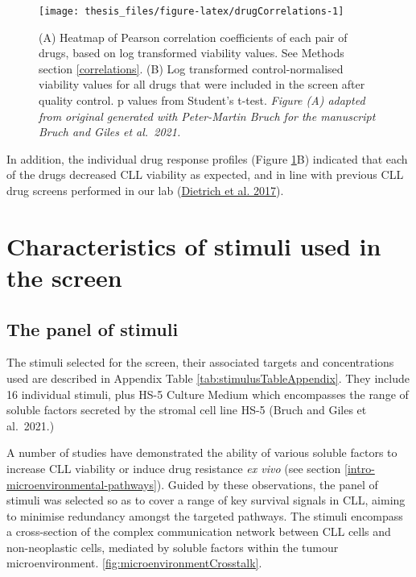 \documentclass[11pt, a4paper, twosided]{book}
\begin{document}
\begin{figure}

{\centering \texttt{[image: thesis\_files/figure-latex/drugCorrelations-1]} 

}

\caption{(A) Heatmap of Pearson correlation coefficients of each pair of drugs, based on log transformed viability values. See Methods section \ref{correlations}. (B) Log transformed control-normalised viability values for all drugs that were included in the screen after quality control. p values from Student's t-test. \emph{Figure (A) adapted from original generated with Peter-Martin Bruch for the manuscript Bruch and Giles et al.~2021.}}\label{fig:drugCorrelations}
\end{figure}
In addition, the individual drug response profiles (Figure \ref{fig:drugCorrelations}B) indicated that each of the drugs decreased CLL viability as expected, and in line with previous CLL drug screens performed in our lab (\protect\hyperlink{ref-JCIpaper}{Dietrich et al. 2017}).

\hypertarget{stimuli}{%
\section{Characteristics of stimuli used in the screen}\label{stimuli}}

\hypertarget{stimuli-info}{%
\subsection{The panel of stimuli}\label{stimuli-info}}

The stimuli selected for the screen, their associated targets and concentrations used are described in Appendix Table \ref{tab:stimulusTableAppendix}. They include 16 individual stimuli, plus HS-5 Culture Medium which encompasses the range of soluble factors secreted by the stromal cell line HS-5 (Bruch and Giles et al.~2021.)

A number of studies have demonstrated the ability of various soluble factors to increase CLL viability or induce drug resistance \emph{ex vivo} (see section \ref{intro-microenvironmental-pathways}). Guided by these observations, the panel of stimuli was selected so as to cover a range of key survival signals in CLL, aiming to minimise redundancy amongst the targeted pathways. The stimuli encompass a cross-section of the complex communication network between CLL cells and non-neoplastic cells, mediated by soluble factors within the tumour microenvironment. \ref{fig:microenvironmentCrosstalk}.
\end{document}
